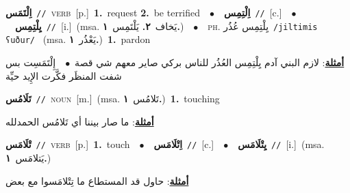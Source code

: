 \documentclass[10pt,a4paper,twoside]{article} %
\begin{document}
\begin{multicols}{2}
{\setlength\topsep{0pt}\textbf{\foreignlanguage{arabic}{اِلْتَمَس}}\ {\color{gray}\texttt{//}\color{black}}\ \textsc{verb}\ [p.]\ \textbf{1.}~request  \textbf{2.}~be terrified\ \ $\bullet$\ \ \setlength\topsep{0pt}\textbf{\foreignlanguage{arabic}{اِلْتِمِس}}\ {\color{gray}\texttt{//}\color{black}}\ [c.]\ \ $\bullet$\ \ \setlength\topsep{0pt}\textbf{\foreignlanguage{arabic}{يِلْتِمِس}}\ {\color{gray}\texttt{//}\color{black}}\ [i.]\ \color{gray}(msa. \foreignlanguage{arabic}{يَخاف}~\foreignlanguage{arabic}{\textbf{٢.}}  \foreignlanguage{arabic}{يَلْتَمِس}~\foreignlanguage{arabic}{\textbf{١.}})\color{black}\ \ $\bullet$\ \ \textsc{ph.} \color{gray} \foreignlanguage{arabic}{يِلْتِمِس عُذُر}\color{black}\ {\color{gray}\texttt{/{\sffamily jiltimis ʕuður}/}\color{black}}\ \color{gray} (msa. \foreignlanguage{arabic}{يَعْذُر}~\foreignlanguage{arabic}{\textbf{١.}})\color{black}\ \textbf{1.}~pardon\  \begin{flushright}\color{gray}\foreignlanguage{arabic}{\textbf{\underline{\foreignlanguage{arabic}{أمثلة}}}: لازم البني آدم يِلْتِمِس العُذُر للناس بركي صاير معهم شي قصة\ $\bullet$\ \  إِلْتَمَسِت بس شفت المنظَر فكَّرت الإِيد حيِّة}\end{flushright}\color{black}} \vspace{2mm}

{\setlength\topsep{0pt}\textbf{\foreignlanguage{arabic}{تَلَامُس}}\ {\color{gray}\texttt{//}\color{black}}\ \textsc{noun}\ [m.]\ \color{gray}(msa. \foreignlanguage{arabic}{تَلامُس}~\foreignlanguage{arabic}{\textbf{١.}})\color{black}\ \textbf{1.}~touching\  \begin{flushright}\color{gray}\foreignlanguage{arabic}{\textbf{\underline{\foreignlanguage{arabic}{أمثلة}}}: ما صار بيننا أي تَلامُس الحمدلله}\end{flushright}\color{black}} \vspace{2mm}

{\setlength\topsep{0pt}\textbf{\foreignlanguage{arabic}{تْلَامَس}}\ {\color{gray}\texttt{//}\color{black}}\ \textsc{verb}\ [p.]\ \textbf{1.}~touch\ \ $\bullet$\ \ \setlength\topsep{0pt}\textbf{\foreignlanguage{arabic}{اِتْلَامَس}}\ {\color{gray}\texttt{//}\color{black}}\ [c.]\ \ $\bullet$\ \ \setlength\topsep{0pt}\textbf{\foreignlanguage{arabic}{يِتْلَامَس}}\ {\color{gray}\texttt{//}\color{black}}\ [i.]\ \color{gray}(msa. \foreignlanguage{arabic}{يَتلامَس}~\foreignlanguage{arabic}{\textbf{١.}})\color{black}\  \begin{flushright}\color{gray}\foreignlanguage{arabic}{\textbf{\underline{\foreignlanguage{arabic}{أمثلة}}}: حاول قد المستطاع ما تِتْلامَسوا مع بعض}\end{flushright}\color{black}} \vspace{2mm}


\end{multicols}
\end{document}
